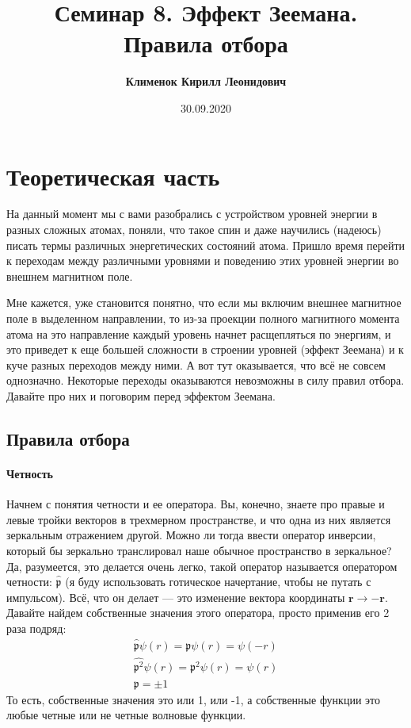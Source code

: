 \documentclass[12pt]{article}
\begin{document}
 
\title{\textbf{Семинар 8. Эффект Зеемана. Правила отбора}}
\author{\textbf{Клименок Кирилл Леонидович}}
\date{30.09.2020}
\maketitle
\section{Теоретическая часть}
На данный момент мы с вами разобрались с устройством уровней энергии в разных сложных атомах, поняли, что такое спин и даже научились (надеюсь) писать термы различных энергетических состояний атома. Пришло время перейти к переходам между различными уровнями и поведению этих уровней энергии во внешнем магнитном поле.

Мне кажется, уже становится понятно, что если мы включим внешнее магнитное поле в выделенном направлении, то из-за проекции полного магнитного момента атома на это направление каждый уровень начнет расщепляться по энергиям, и это приведет к еще большей сложности в строении уровней (эффект Зеемана) и к куче разных переходов между ними. А вот тут оказывается, что всё не совсем однозначно. Некоторые переходы оказываются невозможны в силу правил отбора. Давайте про них и поговорим перед эффектом Зеемана.

\subsection{Правила отбора}
\paragraph{Четность} Начнем с понятия четности и ее оператора. Вы, конечно, знаете про правые и левые тройки векторов в трехмерном пространстве, и что одна из них является зеркальным отражением другой. Можно ли тогда ввести  оператор инверсии, который бы зеркально транслировал наше обычное пространство в зеркальное? Да, разумеется, это делается очень легко, такой оператор называется оператором четности: $\hat{\mathfrak{p}}$ (я буду использовать готическое начертание, чтобы не путать с импульсом). Всё, что он делает --- это изменение вектора координаты $\textbf{r} \rightarrow -\textbf{r}$. Давайте найдем собственные значения этого оператора, просто применив его 2 раза подряд:
\begin{gather*}
\hat{\mathfrak{p}}\psi(r) = \mathfrak{p} \psi(r)=\psi(-r)\\
\hat{\mathfrak{p}^2}\psi(r) = \mathfrak{p}^2 \psi(r) = \psi(r)\\
\mathfrak{p} = \pm 1
\end{gather*}
То есть, собственные значения это или 1, или -1, а собственные функции это любые четные или не четные волновые функции.
\end{document}

